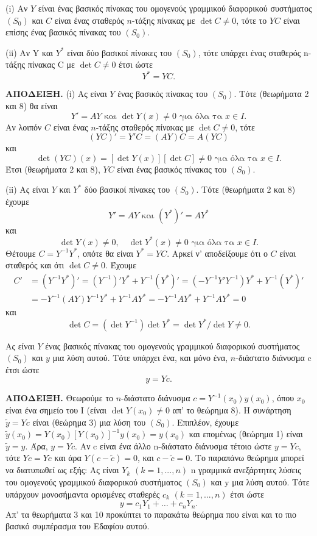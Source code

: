 \documentclass[11pt,a4paper,twoside]{book}
\newcommand{\titlefont}[1]{{\fontfamily{maksf}\selectfont #1}}
\newcounter{thewrhma}[chapter]
\renewcommand{\thethewrhma}{\thechapter.\arabic{thewrhma}}
\newcommand{\thewr}{\refstepcounter{thewrhma}{\bf\titlefont{\textcolor{secondarycolor}{\large Θεώρημα\hspace{2mm}\thethewrhma}}}\hspace{1mm}}{}
\newenvironment{Thewrhma}[1]
{\begin{tcolorbox}[title=\thewr\ \ :\ \  {\textcolor{black}{\bf{\large\titlefont{#1}}}},
breakable,
enhanced standard,
titlerule=-.2pt,
toprule=0pt, 
rightrule=0pt, 
bottomrule=0pt,
colback=white,
left=2mm,
top=1mm,
bottom=0mm,
boxrule=0pt,
colframe=white,
borderline west={1.5mm}{0pt}{secondarycolor},
leftrule=2mm,
sharp corners,
coltitle=secondarycolor]}
{\end{tcolorbox}}
\begin{document}
\begin{Thewrhma}{}
(i) Αν $Y$ είναι ένας βασικός πίνακας του ομογενούς γραμμικού διαφορικού συστήματος $(S_0)$ και $C$ είναι ένας σταθερός $n$-τάξης πίνακας με $\det C \neq 0$, τότε το $YC$ είναι επίσης ένας βασικός πίνακας του $(S_0)$.

(ii) Αν Y και $Y^*$ είναι δύο βασικοί πίνακες του $(S_0)$, τότε υπάρχει ένας σταθερός n-τάξης πίνακας C με $\det C \neq 0$ έτσι ώστε
\[
Y^* = YC.
\]
\end{Thewrhma}
\textbf{ΑΠΟΔΕΙΞΗ.} (i) Ας είναι $Y$ ένας βασικός πίνακας του $(S_0)$. Τότε (θεωρήματα 2 και 8) θα είναι
\[
Y' = AY \text{ και } \det Y(x) \neq 0 \text{ για όλα τα } x \in I.
\]
Αν λοιπόν $C$ είναι ένας $n$-τάξης σταθερός πίνακας με $\det C \neq 0$, τότε
\[
(YC)' = Y'C = (AY)C = A(YC)
\]
και
\[
\det(YC)(x) = [\det Y(x)][\det C] \neq 0 \text{ για όλα τα } x \in I.
\]
Έτσι (θεωρήματα 2 και 8), $YC$ είναι ένας βασικός πίνακας του $(S_0)$.

(ii) Ας είναι $Y$ και $Y^*$ δύο βασικοί πίνακες του $(S_0)$. Τότε (θεωρήματα 2 και 8) έχουμε
\[
Y' = AY \text{ και } (Y^*)' = AY^*
\]
και
\[
\det Y(x) \neq 0, \quad \det Y^*(x) \neq 0 \text{ για όλα τα } x \in I.
\]
Θέτουμε $C=Y^{-1}Y^*$, οπότε θα είναι $Y^*=YC$. Αρκεί ν' αποδείξουμε ότι ο $C$ είναι σταθερός και ότι $\det C \neq 0$. Έχουμε
\begin{align*}
C' &= (Y^{-1}Y^*)' = (Y^{-1})' Y^* + Y^{-1} (Y^*)' = (-Y^{-1}Y'Y^{-1})Y^* + Y^{-1} (Y^*)' \\
&= -Y^{-1}(AY)Y^{-1}Y^* + Y^{-1}AY^* = -Y^{-1}AY^* + Y^{-1}AY^* = 0
\end{align*}
και
\[
\det C = (\det Y^{-1}) \det Y^* = \det Y^* / \det Y \neq 0.
\]

\begin{Thewrhma}{}
Ας είναι $Y$ ένας βασικός πίνακας του ομογενούς γραμμικού διαφορικού συστήματος $(S_0)$ και $y$ μια λύση αυτού. Τότε υπάρχει ένα, και μόνο ένα, $n$-διάστατο διάνυσμα c έτσι ώστε
\[
y = Yc.
\]
\end{Thewrhma}

\textbf{ΑΠΟΔΕΙΞΗ.} Θεωρούμε το $n$-διάστατο διάνυσμα $c = Y^{-1}(x_0)y(x_0)$, όπου $x_0$ είναι ένα σημείο του Ι (είναι $\det Y(x_0) \neq 0$ απ' το θεώρημα 8). Η συνάρτηση $\tilde{y}=Yc$ είναι (θεώρημα 3) μια λύση του $(S_0)$. Επιπλέον, έχουμε $\tilde{y}(x_0) = Y(x_0)[Y(x_0)]^{-1}y(x_0)=y(x_0)$ και επομένως (θεώρημα 1) είναι $\tilde{y}=y$. Άρα, $y=Yc$. Αν c είναι ένα άλλο n-διάστατο διάνυσμα τέτοιο ώστε $y=Yc$, τότε $Yc=Y\tilde{c}$ και άρα $Y(c-\tilde{c})=0$, και $c-\tilde{c}=0$. Το παραπάνω θεώρημα μπορεί να διατυπωθεί ως εξής: Ας είναι $Y_k$ $(k=1,...,n)$ n γραμμικά ανεξάρτητες λύσεις του ομογενούς γραμμικού διαφορικού συστήματος $(S_0)$ και y μια λύση αυτού. Τότε υπάρχουν μονοσήμαντα ορισμένες σταθερές $c_k$ $(k=1,...,n)$ έτσι ώστε
\[
y = c_1Y_1 + \dots + c_nY_n.
\]
Απ' τα θεωρήματα 3 και 10 προκύπτει το παρακάτω θεώρημα που είναι και το πιο βασικό συμπέρασμα του Εδαφίου αυτού.
\end{document}
